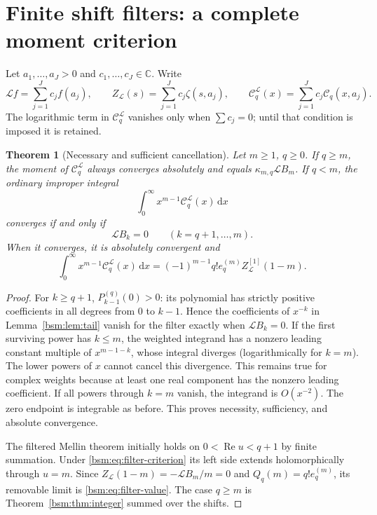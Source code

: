 \documentclass[11pt,letterpaper]{article}
\numberwithin{equation}{section}
\newtheorem{theorem}{Theorem}[section]
\theoremstyle{definition}\newtheorem{definition}[theorem]{Definition}
\theoremstyle{remark}\newtheorem{remark}[theorem]{Remark}
\DeclareMathOperator{\Ree}{Re}
\newcommand{\dd}{\,\mathrm{d}}
\newcommand{\Ccal}{\mathcal C}
\newcommand{\Lcal}{\mathcal L}
\newcommand{\Qcal}{Q}
\newcommand{\C}{\mathbb C}
\begin{document}
\section{Finite shift filters: a complete moment criterion}\label{bsm:sec:filters}

Let $a_1,\ldots,a_J>0$ and $c_1,\ldots,c_J\in\C$. Write
\begin{equation}\label{bsm:eq:filter}
 \Lcal f=\sum_{j=1}^Jc_jf(a_j),\qquad
 Z_{\Lcal}(s)=\sum_{j=1}^Jc_j\zeta(s,a_j),\qquad
 \Ccal_q^{\Lcal}(x)=\sum_{j=1}^Jc_j\Ccal_q(x,a_j).
\end{equation}
The logarithmic term in $\Ccal_q^{\Lcal}$ vanishes only when
$\sum c_j=0$; until that condition is imposed it is retained.

\begin{theorem}[Necessary and sufficient cancellation]\label{bsm:thm:filter}
Let $m\ge1$, $q\ge0$. If $q\ge m$, the moment of
$\Ccal_q^{\Lcal}$ always converges absolutely and equals
$\kappa_{m,q}\Lcal B_m$. If $q<m$, the ordinary improper integral
\begin{equation}\label{bsm:eq:filter-moment}
 \int_0^\infty x^{m-1}\Ccal_q^{\Lcal}(x)\dd x
\end{equation}
converges if and only if
\begin{equation}\label{bsm:eq:filter-criterion}
 \Lcal B_k=0\qquad(k=q+1,\ldots,m).
\end{equation}
When it converges, it is absolutely convergent and
\begin{equation}\label{bsm:eq:filter-value}
 \boxed{\displaystyle
 \int_0^\infty x^{m-1}\Ccal_q^{\Lcal}(x)\dd x
   =(-1)^{m-1}q!e_q^{(m)}Z_{\Lcal}^{[1]}(1-m).}
\end{equation}
\end{theorem}

\begin{proof}
For $k\ge q+1$, $P_{k-1}^{(q)}(0)>0$: its polynomial has strictly
positive coefficients in all degrees from $0$ to $k-1$. Hence the
coefficients of $x^{-k}$ in Lemma~\ref{bsm:lem:tail} vanish for the filter
exactly when $\Lcal B_k=0$. If the first surviving power has $k\le m$,
the weighted integrand has a nonzero leading constant multiple of
$x^{m-1-k}$, whose integral diverges (logarithmically for $k=m$).
The lower powers of $x$ cannot cancel this divergence. This remains
true for complex weights because at least one real component has the
nonzero leading coefficient. If all powers through $k=m$ vanish,
the integrand is $O(x^{-2})$. The zero endpoint is integrable as before.
This proves necessity, sufficiency, and absolute convergence.

The filtered Mellin theorem initially holds on $0<\Ree u<q+1$ by
finite summation. Under \eqref{bsm:eq:filter-criterion} its left side
extends holomorphically through $u=m$. Since
$Z_{\Lcal}(1-m)=-\Lcal B_m/m=0$ and
$\Qcal_q(m)=q!e_q^{(m)}$, its removable limit is
\eqref{bsm:eq:filter-value}. The case $q\ge m$ is
Theorem~\ref{bsm:thm:integer} summed over the shifts.
\end{proof}
\end{document}

